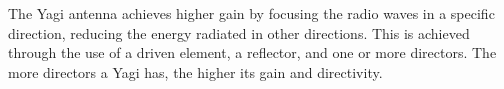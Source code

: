 The Yagi antenna achieves higher gain by focusing the radio waves in a specific direction, reducing the energy radiated in other directions. This is achieved through the use of a driven element, a reflector, and one or more directors. The more directors a Yagi has, the higher its gain and directivity.

